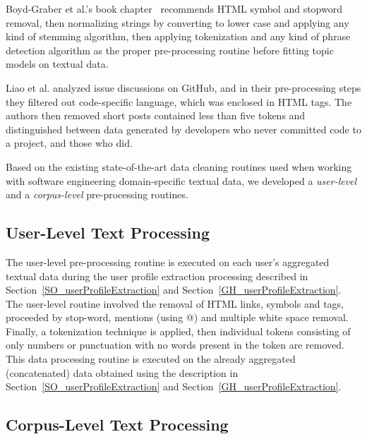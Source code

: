     Boyd-Graber et al.'s book chapter~\cite{boyd2014care} recommends HTML symbol and stopword removal, then normalizing strings by converting to lower case and applying any kind of stemming algorithm, then applying tokenization and any kind of phrase detection algorithm as the proper pre-processing routine before fitting topic models on textual data.
    
    Liao et al. \cite{liao2019status} analyzed issue discussions on GitHub, and in their pre-processing steps they filtered out code-specific language, which was enclosed in HTML tags. The authors then removed short posts contained less than five tokens and distinguished between data generated by developers who never committed code to a project, and those who did. 
    
    Based on the existing state-of-the-art data cleaning routines used when working with software engineering domain-specific textual data, we developed a \emph{user-level} and a \emph{corpus-level} pre-processing routines. 
    
    \subsection{User-Level Text Processing}
    
        The user-level pre-processing routine is executed on each user's aggregated textual data during the user profile extraction processing described in Section~\ref{SO_userProfileExtraction} and Section~\ref{GH_userProfileExtraction}. The user-level routine involved the removal of HTML links, symbols and tags, proceeded by stop-word, mentions (using @) and multiple white space removal. Finally, a tokenization technique is applied, then individual tokens consisting of only numbers or punctuation with no words present in the token are removed. This data processing routine is executed on the already aggregated (concatenated) data obtained using the description in Section~\ref{SO_userProfileExtraction} and Section~\ref{GH_userProfileExtraction}.
        
    \subsection{Corpus-Level Text Processing\label{CorpusLevel_preprocessing}}
    
